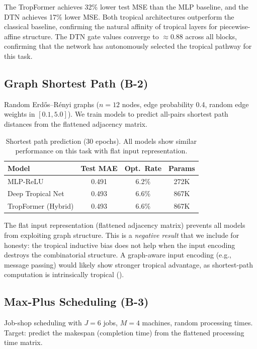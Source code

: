 \documentclass[11pt,twocolumn]{article}
\begin{document}
The TropFormer achieves 32\% lower test MSE than the MLP baseline, and
the DTN achieves 17\% lower MSE. Both tropical architectures outperform
the classical baseline, confirming the natural affinity of tropical layers
for piecewise-affine structure. The DTN gate values converge to $\approx 0.88$
across all blocks, confirming that the network has autonomously selected the
tropical pathway for this task.

\subsection{Graph Shortest Path (B-2)}

Random Erd\H{o}s--R\'{e}nyi graphs ($n=12$ nodes, edge probability 0.4,
random edge weights in $[0.1, 5.0]$). We train models to predict all-pairs
shortest path distances from the flattened adjacency matrix.

\begin{table}[t]
\centering
\caption{Shortest path prediction (30 epochs). All models show similar
  performance on this task with flat input representation.}
\label{tab:shortest}
\begin{tabular}{lccc}
\toprule
\textbf{Model} & \textbf{Test MAE} & \textbf{Opt.\ Rate} & \textbf{Params} \\
\midrule
MLP-ReLU              & 0.491 & 6.2\% & 272K \\
Deep Tropical Net     & 0.493 & 6.6\% & 867K \\
TropFormer (Hybrid)   & 0.493 & 6.6\% & 867K \\
\bottomrule
\end{tabular}
\end{table}

The flat input representation (flattened adjacency matrix) prevents all
models from exploiting graph structure. This is a \emph{negative result}
that we include for honesty: the tropical inductive bias does not help when
the input encoding destroys the combinatorial structure. A graph-aware input
encoding (e.g., message passing) would likely show stronger tropical
advantage, as shortest-path computation is intrinsically tropical
().

\subsection{Max-Plus Scheduling (B-3)}

Job-shop scheduling with $J=6$ jobs, $M=4$ machines, random processing
times. Target: predict the makespan (completion time) from the flattened
processing time matrix.
\end{document}
